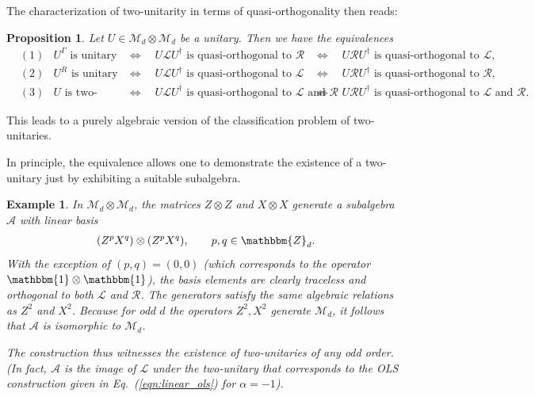 \documentclass[aps,nofootinbib,floatfix,a4paper]{revtex4}
\newtheorem{example}[theorem]{Example}
\newtheorem{proposition}[theorem]{Proposition}
\newcommand{\1}{\mbox{$\mathbf{1}$}}
\def\ZZ{\mathbbm{Z}}
\def\A{\mathcal{A}}
\def\M{\mathcal{M}}
\def\R{\mathcal{R}}
\def\Id{\mathbbm{1}}
\begin{document}
The characterization of two-unitarity in terms of quasi-orthogonality then reads:
\begin{proposition}\label{prop:quasi_orthogonal}
	Let 
	$U\in \M_d\otimes \M_d$
	be a unitary.
	Then we have the equivalences
	\begin{align*}
		&(1) &
		U^\Gamma\text{ is unitary}
			 &\quad\Leftrightarrow\quad
		U\mathcal{L}U^\dagger\text{ is quasi-orthogonal to }\mathcal{R} &
																																		&\quad\Leftrightarrow\quad
		U\mathcal{R}U^\dagger\text{ is quasi-orthogonal to }\mathcal{L}, \\
			 &(2) &
		U^R\text{ is unitary}
			 &\quad\Leftrightarrow\quad 
		U\mathcal{L}U^\dagger\text{ is quasi-orthogonal to }\mathcal{L} &
			 &\quad\Leftrightarrow\quad
		U\mathcal{R}U^\dagger\text{ is quasi-orthogonal to }\mathcal{R},\\
			 &(3) &
		U\text{ is two-unitary}
			 &\quad\Leftrightarrow\quad
		U\mathcal{L}U^\dagger\text{ is quasi-orthogonal to }\mathcal{L}\text{ and }\mathcal{R} &
																																													 &\quad\Leftrightarrow\quad
		U\mathcal{R}U^\dagger\text{ is quasi-orthogonal to }\mathcal{L}\text{ and }\mathcal{R}.
 \end{align*}
\end{proposition}

This leads to a purely algebraic version of the classification problem of two-unitaries.

\algebraic*




In principle, the equivalence allows one to demonstrate the existence of a two-unitary just by exhibiting a suitable subalgebra.

\begin{example}
	In $\M_d\otimes \M_d$, the matrices $Z\otimes Z$ and $X\otimes X$
	generate a subalgebra $\A$ with linear basis
	\begin{align*}
		(Z^p X^q)\otimes (Z^p X^q),
		\qquad
		p,q\in\ZZ_d.
	\end{align*}
	With the exception of $(p,q)=(0,0)$ (which corresponds to the operator $\Id\otimes\Id$), the basis elements are clearly traceless and orthogonal to both $\mathcal{L}$ and $\R$.
	The generators satisfy the same algebraic relations as $Z^2$ and $X^2$.
	Because for odd $d$ the operators $Z^2, X^2$ generate $\M_d$, it follows that $\A$ is isomorphic to $\M_d$.

	The construction thus witnesses the existence of two-unitaries of any odd order.
	(In fact, $\A$ is the image of $\mathcal{L}$ under the two-unitary that corresponds to the OLS construction given in Eq.~(\ref{eqn:linear_ols}) for $\alpha=-1$). %
\end{example}
\end{document}
